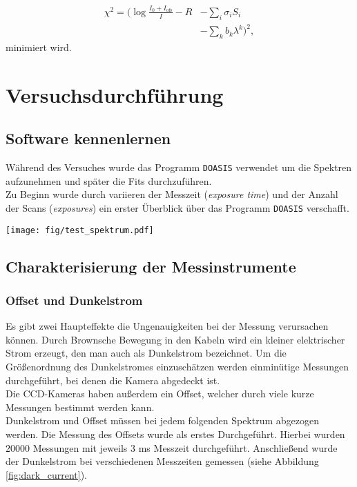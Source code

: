 \documentclass[12pt, a4paper, bibliography=totoc]{scrartcl}
\begin{document}
\begin{multicols}{2}
\begin{align*}
    \chi^2 = ( \log \frac{I_0 + I_\text{ofs}}{I} - R & - \sum_i \sigma_i S_i \\ 
    & - \sum_k b_k \lambda^k )^2 ,
\end{align*}
minimiert wird.

\section{Versuchsdurchführung}\label{sec:versuchsdurchführung}

\subsection{Software kennenlernen}\label{get_to_know_the_software}

Während des Versuches wurde das Programm \verb*+DOASIS+ verwendet um die Spektren aufzunehmen und später die Fits durchzuführen.\\
Zu Beginn wurde durch variieren der Messzeit (\textit{exposure time}) und der Anzahl der Scans (\textit{exposures}) ein erster Überblick über das Programm \verb*+DOASIS+ verschafft.

\begin{center}
	\texttt{[image: fig/test\_spektrum.pdf]}
	\label{fig:test_spectrum}

\end{center}

\subsection{Charakterisierung der Messinstrumente}\label{ssec:characteristic_of_the_instruments}

\subsubsection{Offset und Dunkelstrom}\label{sssec:O&D}

Es gibt zwei Haupteffekte die Ungenauigkeiten bei der Messung verursachen können.
Durch Brownsche Bewegung in den Kabeln wird ein kleiner elektrischer Strom erzeugt, den man auch als Dunkelstrom bezeichnet.
Um die Größenordnung des Dunkelstromes einzuschätzen werden einminütige Messungen durchgeführt, bei denen die Kamera abgedeckt ist.\\
Die CCD-Kameras haben außerdem ein Offset, welcher durch viele kurze Messungen bestimmt werden kann.\\
Dunkelstrom und Offset müssen bei jedem folgenden Spektrum abgezogen werden.
Die Messung des Offsets wurde als erstes Durchgeführt. 
Hierbei wurden $20000$ Messungen mit jeweils $3$ \si{ms} Messzeit durchgeführt.
Anschließend wurde der Dunkelstrom bei verschiedenen Messzeiten gemessen (siehe Abbildung \ref{fig:dark_current}).
    

\end{multicols}
\end{document}
